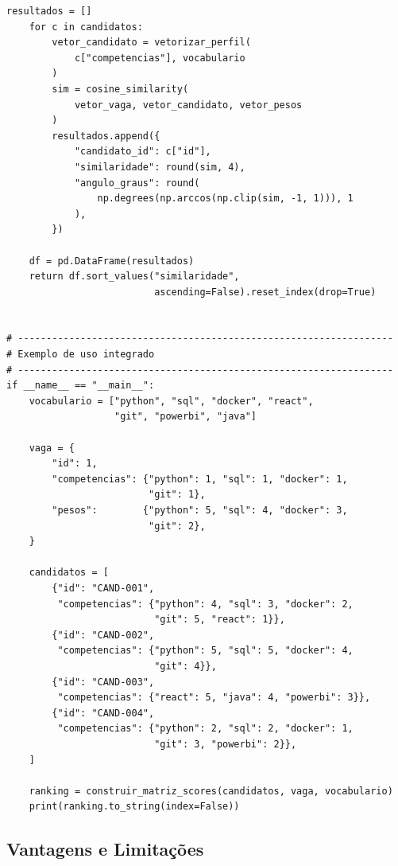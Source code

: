 \documentclass[12pt,a4paper]{article}
\begin{document}
\begin{lstlisting}[caption={Cosine Similarity para matching de vagas e candidatos},
                   label={lst:cosine}]
    resultados = []
    for c in candidatos:
        vetor_candidato = vetorizar_perfil(
            c["competencias"], vocabulario
        )
        sim = cosine_similarity(
            vetor_vaga, vetor_candidato, vetor_pesos
        )
        resultados.append({
            "candidato_id": c["id"],
            "similaridade": round(sim, 4),
            "angulo_graus": round(
                np.degrees(np.arccos(np.clip(sim, -1, 1))), 1
            ),
        })

    df = pd.DataFrame(resultados)
    return df.sort_values("similaridade",
                          ascending=False).reset_index(drop=True)


# ------------------------------------------------------------------
# Exemplo de uso integrado
# ------------------------------------------------------------------
if __name__ == "__main__":
    vocabulario = ["python", "sql", "docker", "react",
                   "git", "powerbi", "java"]

    vaga = {
        "id": 1,
        "competencias": {"python": 1, "sql": 1, "docker": 1,
                         "git": 1},
        "pesos":        {"python": 5, "sql": 4, "docker": 3,
                         "git": 2},
    }

    candidatos = [
        {"id": "CAND-001",
         "competencias": {"python": 4, "sql": 3, "docker": 2,
                          "git": 5, "react": 1}},
        {"id": "CAND-002",
         "competencias": {"python": 5, "sql": 5, "docker": 4,
                          "git": 4}},
        {"id": "CAND-003",
         "competencias": {"react": 5, "java": 4, "powerbi": 3}},
        {"id": "CAND-004",
         "competencias": {"python": 2, "sql": 2, "docker": 1,
                          "git": 3, "powerbi": 2}},
    ]

    ranking = construir_matriz_scores(candidatos, vaga, vocabulario)
    print(ranking.to_string(index=False))
\end{lstlisting}

\subsection{Vantagens e Limitações}
\end{document}
